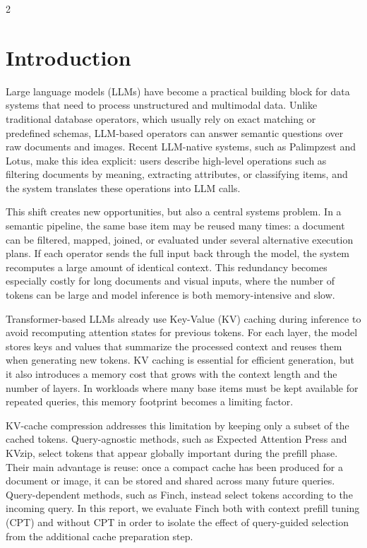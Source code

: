 \documentclass[10pt,a4paper]{article}
\begin{document}
\begin{multicols}{2}

\section{Introduction}

Large language models (LLMs) have become a practical building block for data
systems that need to process unstructured and multimodal data. Unlike
traditional database operators, which usually rely on exact matching or
predefined schemas, LLM-based operators can answer semantic questions over raw
documents and images. Recent LLM-native systems, such as Palimpzest and Lotus,
make this idea explicit: users describe high-level operations such as filtering
documents by meaning, extracting attributes, or classifying items, and the
system translates these operations into LLM calls.

This shift creates new opportunities, but also a central systems problem. In a
semantic pipeline, the same base item may be reused many times: a document can
be filtered, mapped, joined, or evaluated under several alternative execution
plans. If each operator sends the full input back through the model, the system
recomputes a large amount of identical context. This redundancy becomes
especially costly for long documents and visual inputs, where the number of
tokens can be large and model inference is both memory-intensive and slow.

Transformer-based LLMs already use Key-Value (KV) caching during inference to
avoid recomputing attention states for previous tokens. For each layer, the
model stores keys and values that summarize the processed context and reuses
them when generating new tokens. KV caching is essential for efficient
generation, but it also introduces a memory cost that grows with the context
length and the number of layers. In workloads where many base items must be
kept available for repeated queries, this memory footprint becomes a limiting
factor.

KV-cache compression addresses this limitation by keeping only a subset of the
cached tokens. Query-agnostic methods, such as Expected Attention Press and
KVzip, select tokens that appear globally important during the prefill phase.
Their main advantage is reuse: once a compact cache has been produced for a
document or image, it can be stored and shared across many future queries.
Query-dependent methods, such as Finch, instead select tokens according to the
incoming query. In this report, we evaluate Finch both with context prefill
tuning (CPT) and without CPT in order to isolate the effect of query-guided
selection from the additional cache preparation step.


\end{multicols}
\end{document}
